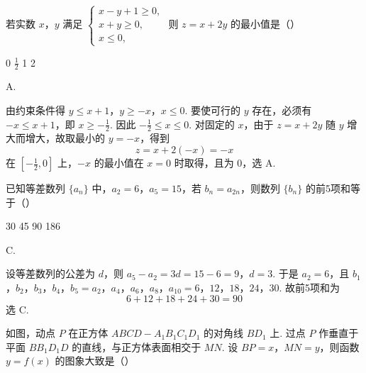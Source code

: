 \begin{problem}
若实数 \(x\)，\(y\) 满足 \(\begin{cases}
x - y + 1 \geqslant 0,\\
x + y \geqslant 0,\\
x \leqslant 0,
\end{cases}\) 则 \(z = x + 2y\) 的最小值是（\quad）

\choices
    {0}
    {\(\frac{1}{2}\)}
    {1}
    {2}
\end{problem}

\begin{answer}
A.
\end{answer}

\begin{solution}
由约束条件得
\(y\leqslant x+1\)，\(y\geqslant-x\)，\(x\leqslant0\).
要使可行的 \(y\) 存在，必须有 \(-x\leqslant x+1\)，即 \(x\geqslant-\frac12\). 因此
\(-\frac12\leqslant x\leqslant0\). 对固定的 \(x\)，由于 \(z=x+2y\) 随 \(y\) 增大而增大，故取最小的 \(y=-x\)，得到
\[
z=x+2(-x)=-x
\]
在 \([-\frac12,0]\) 上，\(-x\) 的最小值在 \(x=0\) 时取得，且为 \(0\)，选 A.
\end{solution}

\begin{problem}
已知等差数列 \(\{a_{n}\}\) 中，\(a_{2} = 6\)，\(a_{5} = 15\)，若 \(b_{n} = a_{2n}\)，则数列 \(\{b_{n}\}\) 的前5项和等于（\quad）

\choices
    {30}
    {45}
    {90}
    {186}
\end{problem}

\begin{answer}
C.
\end{answer}

\begin{solution}
设等差数列的公差为 \(d\)，则
\(a_5-a_2=3d=15-6=9\)，\(d=3\).
于是 \(a_2=6\)，且
\(b_1\)，\(b_2\)，\(b_3\)，\(b_4\)，\(b_5=a_2\)，\(a_4\)，\(a_6\)，\(a_8\)，\(a_{10}=6\)，\(12\)，\(18\)，\(24\)，\(30\).
故前5项和为
\[
6+12+18+24+30=90
\]
选 C.
\end{solution}

\begin{problem}
如图，动点 \(P\) 在正方体 \(ABCD - A_{1}B_{1}C_{1}D_{1}\) 的对角线 \(BD_{1}\) 上. 过点 \(P\) 作垂直于平面 \(BB_{1}D_{1}D\) 的直线，与正方体表面相交于 \(MN\). 设 \(BP = x\)，\(MN = y\)，则函数 \(y = f(x)\) 的图象大致是（\quad）


    {}
    {}
    {}
\end{problem}

